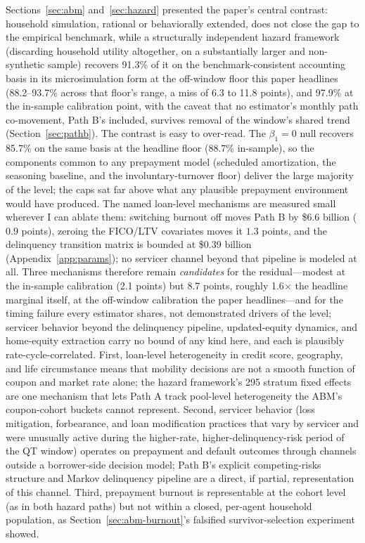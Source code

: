 \documentclass[12pt]{article}
\begin{document}
Sections~\ref{sec:abm} and~\ref{sec:hazard} presented the paper's central contrast: household simulation, rational or behaviorally extended, does not close the gap to the empirical benchmark, while a structurally independent hazard framework (discarding household utility altogether, on a substantially larger and non-synthetic sample) recovers 91.3\% of it on the benchmark-consistent accounting basis in its microsimulation form at the off-window floor this paper headlines (88.2--93.7\% across that floor's range, a miss of 6.3 to 11.8 points), and 97.9\% at the in-sample calibration point, with the caveat that no estimator's monthly path co-movement, Path B's included, survives removal of the window's shared trend (Section~\ref{sec:pathb}). The contrast is easy to over-read. The $\beta_1 = 0$ null recovers 85.7\% on the same basis at the headline floor (88.7\% in-sample), so the components common to any prepayment model (scheduled amortization, the seasoning baseline, and the involuntary-turnover floor) deliver the large majority of the level; the caps sat far above what any plausible prepayment environment would have produced. The named loan-level mechanisms are measured small wherever I can ablate them: switching burnout off moves Path B by \$6.6 billion ($0.9$ points), zeroing the FICO/LTV covariates moves it $1.3$ points, and the delinquency transition matrix is bounded at \$0.39 billion (Appendix~\ref{app:params}); no servicer channel beyond that pipeline is modeled at all. Three mechanisms therefore remain \emph{candidates} for the residual---modest at the in-sample calibration (2.1 points) but 8.7 points, roughly 1.6$\times$ the headline marginal itself, at the off-window calibration the paper headlines---and for the timing failure every estimator shares, not demonstrated drivers of the level; servicer behavior beyond the delinquency pipeline, updated-equity dynamics, and home-equity extraction carry no bound of any kind here, and each is plausibly rate-cycle-correlated. First, loan-level heterogeneity in credit score, geography, and life circumstance means that mobility decisions are not a smooth function of coupon and market rate alone; the hazard framework's 295 stratum fixed effects are one mechanism that lets Path A track pool-level heterogeneity the ABM's coupon-cohort buckets cannot represent. Second, servicer behavior (loss mitigation, forbearance, and loan modification practices that vary by servicer and were unusually active during the higher-rate, higher-delinquency-risk period of the QT window) operates on prepayment and default outcomes through channels outside a borrower-side decision model; Path B's explicit competing-risks structure and Markov delinquency pipeline are a direct, if partial, representation of this channel. Third, prepayment burnout is representable at the cohort level (as in both hazard paths) but not within a closed, per-agent household population, as Section~\ref{sec:abm-burnout}'s falsified survivor-selection experiment showed.
\end{document}
